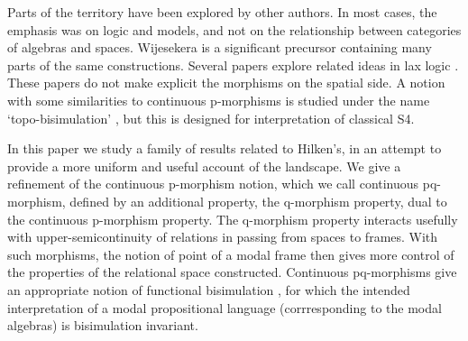 \documentclass{article}[a4paper]
\theoremstyle{definition}
\begin{document}

Parts of the territory have been explored by other authors. In most cases, the emphasis was on logic and models, and not on the relationship between categories of algebras and spaces. Wijesekera \cite{wijesekera1990constructive} is a significant precursor containing many parts of the same constructions.  
Several papers explore related ideas in lax logic \cite{FM97PLL,AMPR01}. 
These papers do not make explicit the morphisms on the spatial side. 
 A notion with some similarities to continuous p-morphisms is studied under the name `topo-bisimulation'  \cite{aiello2003reasoning}, but this is designed for interpretation of classical S4. 



In this paper we study a family of results related to Hilken's, in an attempt to provide a more uniform and useful account of the landscape. We give a refinement of the continuous p-morphism notion, which we call continuous pq-morphism, defined by an additional property, the q-morphism property, dual to the continuous p-morphism property. The q-morphism property interacts usefully with upper-semicontinuity of relations in passing from spaces to frames. With such morphisms, the notion of point of a modal frame then gives more control of the properties of the relational space constructed. 
Continuous pq-morphisms give an appropriate notion of functional bisimulation \cite{popkorn}, for which the intended interpretation of a modal propositional language (corrresponding to the modal algebras) is bisimulation invariant.
\end{document}
